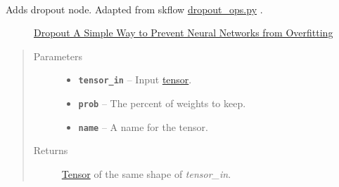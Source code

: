 \documentclass[letterpaper,10pt,english]{sphinxmanual}
\begin{document}

\begin{fulllineitems}
\label{node_ops:node_ops.cross_entropy}
\end{fulllineitems}


\begin{fulllineitems}
\label{node_ops:node_ops.detection}
\end{fulllineitems}


\begin{fulllineitems}
\label{node_ops:node_ops.dropout}~\begin{description}
\item[{Adds dropout node. Adapted from skflow \href{https://github.com/tensorflow/skflow/blob/master/skflow/ops/dropout\_ops.py}{dropout\_ops.py} .}] \leavevmode
\href{https://www.cs.toronto.edu/~hinton/absps/JMLRdropout.pdf}{Dropout A Simple Way to Prevent Neural Networks from Overfitting}

\end{description}
\begin{quote}\begin{description}
\item[{Parameters}] \leavevmode\begin{itemize}
\item {} 
\textbf{\texttt{tensor\_in}} -- Input \href{https://www.tensorflow.org/versions/r0.7/api\_docs/python/framework.html\#Tensor}{tensor}.

\item {} 
\textbf{\texttt{prob}} -- The percent of weights to keep.

\item {} 
\textbf{\texttt{name}} -- A name for the tensor.

\end{itemize}

\item[{Returns}] \leavevmode
\href{https://www.tensorflow.org/versions/r0.7/api\_docs/python/framework.html\#Tensor}{Tensor} of the same shape of \emph{tensor\_in}.

\end{description}\end{quote}

\end{fulllineitems}
\end{document}
